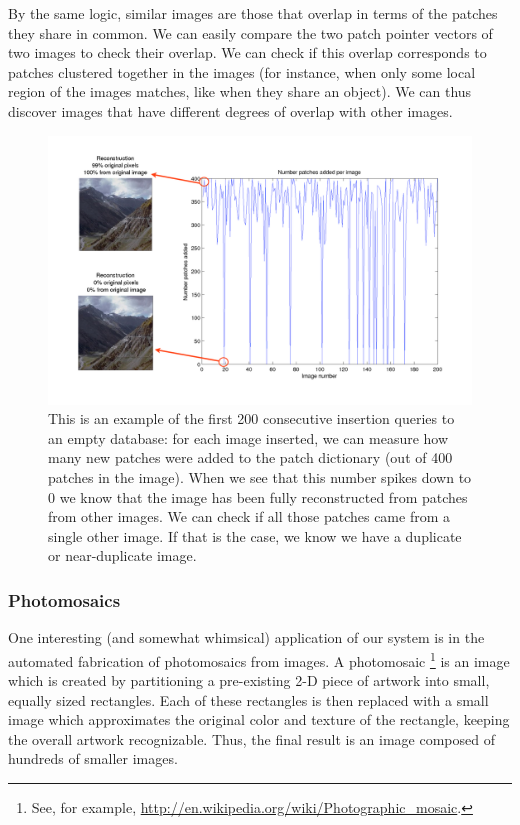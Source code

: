 By the same logic, similar images are those that overlap in terms of the patches they share in common. We can easily compare the two patch pointer vectors of two images to check their overlap. We can check if this overlap corresponds to patches clustered together in the images (for instance, when only some local region of the images matches, like when they share an object). We can thus discover images that have different degrees of overlap with other images.

 \begin{figure}
\hspace{-8mm}
\includegraphics[width=1.2\linewidth]{Figures/dupDetection.pdf}
\caption{This is an example of the first 200 consecutive insertion queries to an empty database: for each image inserted, we can measure how many new patches were added to the patch dictionary (out of 400 patches in the image). When we see that this number spikes down to 0 we know that the image has been fully reconstructed from patches from other images. We can check if all those patches came from a single other image. If that is the case, we know we have a duplicate or near-duplicate image. }
\label{fig:dups}
\end{figure}

\subsubsection{Photomosaics}\label{sec:photo}

One interesting (and somewhat whimsical) application of our system is in the automated fabrication of photomosaics from images.  A photomosaic \footnote{See, for example, \url{http://en.wikipedia.org/wiki/Photographic_mosaic}.} is an image which is created by partitioning a pre-existing 2-D piece of artwork into small, equally sized rectangles.  Each of these rectangles is then replaced with a small image which approximates the original color and texture of the rectangle, keeping the overall artwork recognizable.  Thus, the final result is an image composed of hundreds of smaller images.

